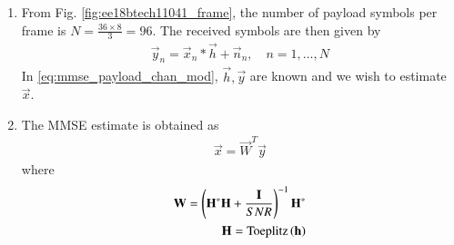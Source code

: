\begin{enumerate}[label=\thesubsection.\arabic*.,ref=\thesubsection.\theenumi]


\item From Fig. \ref{fig:ee18btech11041_frame}, the number of payload symbols per frame is $N=\frac{36 \times 8}{3} = 96$.
The received symbols are then given by 
\begin{align}
\vec{y}_n = \vec{x}_n*\vec{h}+ \vec{n}_n, \quad n = 1, \dots, N
\label{eq:mmse_payload_chan_mod}
\end{align}
%
In \eqref{eq:mmse_payload_chan_mod}, $\vec{h}, \vec{y}$ are known and we wish to estimate $\vec{x}$.

\item The MMSE estimate is obtained as
\begin{align}
\vec{x} = \vec{W}^T\vec{y}
\end{align}
where 
\begin{align}
\mathbf{W} = \left(\mathbf{H}^*\mathbf{H}+\frac{ \mathbf{I}}{SNR}\right)^{-1}\mathbf{H}^{*}
\\
\mathbf{H} = \text{Toeplitz}\left(\mathbf{h}\right)
\end{align}

\end{enumerate}
